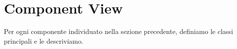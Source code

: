 \documentclass[../../../../dd.tex]{subfiles}
\begin{document}
	\section{Component View}

	Per ogni componente individuato nella sezione precedente, definiamo le classi principali e le descriviamo.
	
\end{document}
